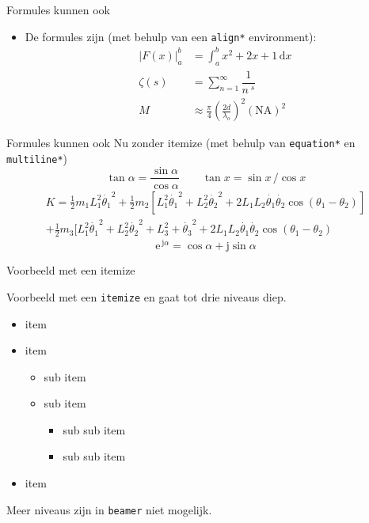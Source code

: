 \documentclass[fleqn,aspectratio=169,dutch,10pt]{beamer}
\begin{document}
\beamerthemethuaslogotrue


\begin{frame}{Formules kunnen ook}
\begin{itemize}
\item De formules zijn (met behulp van een \lstinline|align*| environment):
\begin{align*}
\left|F(x)\right|^b_a &= \int_a^b x^2 + 2x + 1 \, \mathrm{d} x \\
\zeta (s) &= \sum_{n=1}^\infty \dfrac{1}{n^{\;\!s}} \\
M&\approx\frac{\pi}{4}\left(\frac{2d}{\lambda_o}\right)^2\left(\mathrm{NA}\right)^2
\end{align*}
\end{itemize}
\end{frame}


\begin{frame}{Formules kunnen ook}
Nu zonder itemize (met behulp van \lstinline|equation*| en \lstinline|multiline*|)
\begin{equation*}
\tan \alpha = \dfrac{\sin \alpha}{\cos \alpha} \qquad \tan x = \sin x \, / \cos x
\end{equation*}
\begin{multline*}  
K=\displaystyle{\frac{1}{2}m_1 L_1^2 \dot{\theta_1}^2+\frac{1}{2} m_2[L_1^2 \dot{\theta_1}^2+L_2^2 \dot{\theta_2}^2+2 L_1 L_2 \dot{\theta_1}\dot{\theta_2}\cos(\theta_1-\theta_2)]} \\
 \displaystyle{+\frac{1}{2}m_3[L_1^2 \dot{\theta_1}^2+L_2^2 \dot{\theta_2}^2+L_3^2+ \dot{\theta_3}^2+2 L_1 L_2 \dot{\theta_1}\dot{\theta_2}\cos(\theta_1-\theta_2)}
\end{multline*}
\begin{equation*}
\mathrm{e}^{\, \mathrm{j}\alpha} = \cos \alpha + \mathrm{j} \sin \alpha
\end{equation*}
\end{frame}


\begin{frame}{Voorbeeld met een itemize}

Voorbeeld met een \texttt{itemize} en gaat tot drie niveaus diep.
\begin{itemize}
\item item
\item item
\begin{itemize}
\item sub item
\item sub item
\begin{itemize}
\item sub sub item
\item sub sub item
\end{itemize}
\end{itemize}
\item item
\end{itemize}
Meer niveaus zijn in \lstinline|beamer| niet mogelijk.
\end{frame}
\end{document}
